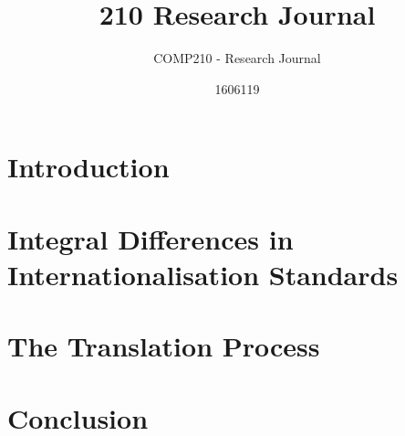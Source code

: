 \documentclass{scrartcl}
\title{210 Research Journal}
\subtitle{COMP210 - Research Journal}
\author{1606119}
\begin{document}
\maketitle



\section{Introduction}
 

\section{Integral Differences in Internationalisation Standards}



\section{The Translation Process}


\noindent 

\section{Conclusion}


\raggedright


\end{document}
